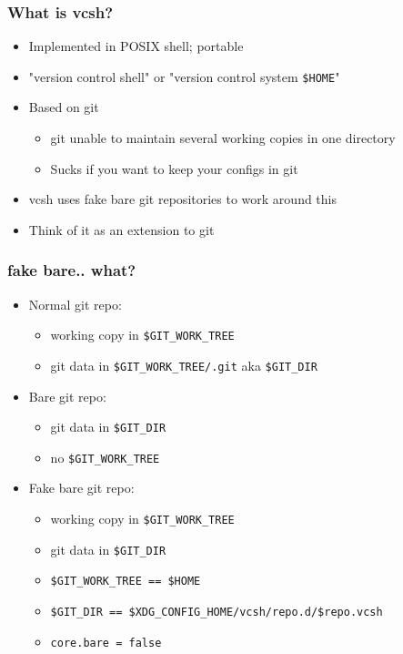 \documentclass[t]{beamer}
\begin{document}
\begin{frame}
	\frametitle{What is vcsh?}
	\begin{itemize}
		\item Implemented in POSIX shell; portable
		\item "version control shell" or "version control system \texttt{\$HOME}"
		\item Based on git
		\begin{itemize}
			\item git unable to maintain several working copies in one directory
			\item Sucks if you want to keep your configs in git
		\end{itemize}
		\item vcsh uses fake bare git repositories to work around this
		\item Think of it as an extension to git
	\end{itemize}
\end{frame}

\begin{frame}
	\frametitle{fake bare.. what?}
	\begin{itemize}
		\item Normal git repo:
		\begin{itemize}
			\item working copy in \texttt{\$GIT\_WORK\_TREE}
			\item git data in \texttt{\$GIT\_WORK\_TREE/.git} aka \texttt{\$GIT\_DIR}
		\end{itemize}
		\item Bare git repo:
		\begin{itemize}
			\item git data in \texttt{\$GIT\_DIR}
			\item no  \texttt{\$GIT\_WORK\_TREE}
		\end{itemize}
		\item Fake bare git repo:
		\begin{itemize}
			\item working copy in \texttt{\$GIT\_WORK\_TREE}
			\item git data in \texttt{\$GIT\_DIR}
			\item \texttt{\$GIT\_WORK\_TREE == \$HOME}
			\item \texttt{\$GIT\_DIR == \$XDG\_CONFIG\_HOME/vcsh/repo.d/\$repo.vcsh}
			\item \texttt{core.bare = false}
		\end{itemize}
	\end{itemize}
\end{frame}
\end{document}
